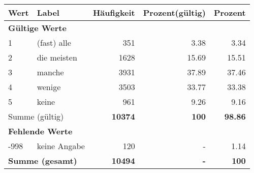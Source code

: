      \begin{longtable}{lXrrr}
     \toprule
     \textbf{Wert} & \textbf{Label} & \textbf{Häufigkeit} & \textbf{Prozent(gültig)} & \textbf{Prozent} \\
     \endhead
     \midrule
     \multicolumn{5}{l}{\textbf{Gültige Werte}}\\

     1 &
     \multicolumn{1}{X}{ (fast) alle   } &


       \num{351} &
       \num[round-mode=places,round-precision=2]{3,38} &
         \num[round-mode=places,round-precision=2]{3,34} \\

     2 &
     \multicolumn{1}{X}{ die meisten   } &


       \num{1628} &
       \num[round-mode=places,round-precision=2]{15,69} &
         \num[round-mode=places,round-precision=2]{15,51} \\

     3 &
     \multicolumn{1}{X}{ manche   } &


       \num{3931} &
       \num[round-mode=places,round-precision=2]{37,89} &
         \num[round-mode=places,round-precision=2]{37,46} \\

     4 &
     \multicolumn{1}{X}{ wenige   } &


       \num{3503} &
       \num[round-mode=places,round-precision=2]{33,77} &
         \num[round-mode=places,round-precision=2]{33,38} \\

     5 &
     \multicolumn{1}{X}{ keine   } &


       \num{961} &
       \num[round-mode=places,round-precision=2]{9,26} &
         \num[round-mode=places,round-precision=2]{9,16} \\
     \midrule
     \multicolumn{2}{l}{Summe (gültig)} &
       \textbf{\num{10374}} &
     \textbf{100} &
       \textbf{\num[round-mode=places,round-precision=2]{98,86}} \\
     \multicolumn{5}{l}{\textbf{Fehlende Werte}}\\
       -998 &
       keine Angabe &
         \num{120} &
        - &
         \num[round-mode=places,round-precision=2]{1,14} \\
     \midrule
     \multicolumn{2}{l}{\textbf{Summe (gesamt)}} &
          \textbf{\num{10494}} &
        \textbf{-} &
        \textbf{100} \\
     \bottomrule
     \end{longtable}
     

